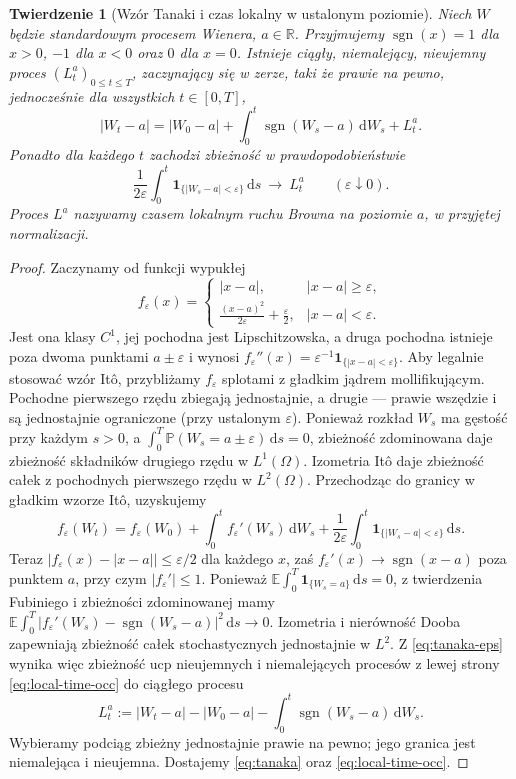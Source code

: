 \documentclass[11pt,a4paper,oneside]{report}
\numberwithin{equation}{chapter}
\theoremstyle{plain}
\newtheorem{twierdzenie}{Twierdzenie}[chapter]
\theoremstyle{definition}
\theoremstyle{remark}
\newcommand{\R}{\mathbb{R}}
\newcommand{\Prob}{\mathbb{P}}
\newcommand{\E}{\mathbb{E}}
\newcommand{\ind}[1]{\mathbf{1}_{#1}}
\newcommand{\dd}{\mathrm{d}}
\begin{document}
\begin{twierdzenie}[Wzór Tanaki i czas lokalny w ustalonym poziomie]
\label{th:tanaka}
Niech $W$ będzie standardowym procesem Wienera, $a\in\R$.
Przyjmujemy $\operatorname{sgn}(x)=1$ dla $x>0$,
$-1$ dla $x<0$ oraz $0$ dla $x=0$. Istnieje ciągły,
niemalejący, nieujemny proces $(L_t^a)_{0\le t\le T}$,
zaczynający się w zerze, taki że prawie na pewno,
jednocześnie dla wszystkich $t\in[0,T]$,
\[
|W_t-a|=|W_0-a|+\int_0^t\operatorname{sgn}(W_s-a)
\,\dd W_s+L_t^a.
\tag{3.7}\label{eq:tanaka}
\]
Ponadto dla każdego $t$ zachodzi zbieżność w
prawdopodobieństwie
\[
\frac1{2\varepsilon}\int_0^t
\ind{\{|W_s-a|<\varepsilon\}}\,\dd s
\ \longrightarrow\ L_t^a
\qquad(\varepsilon\downarrow0).
\tag{3.8}\label{eq:local-time-occ}
\]
Proces $L^a$ nazywamy \emph{czasem lokalnym} ruchu Browna
na poziomie $a$, w przyjętej normalizacji.
\end{twierdzenie}
\begin{proof}
Zaczynamy od funkcji wypukłej
\[
f_\varepsilon(x)=
\begin{cases}
|x-a|,&|x-a|\ge\varepsilon,\\
\displaystyle\frac{(x-a)^2}{2\varepsilon}+
\frac\varepsilon2,&|x-a|<\varepsilon.
\end{cases}
\]
Jest ona klasy $C^1$, jej pochodna jest Lipschitzowska,
a druga pochodna istnieje poza dwoma punktami
$a\pm\varepsilon$ i wynosi
$f_\varepsilon''(x)=\varepsilon^{-1}
\ind{\{|x-a|<\varepsilon\}}$.
Aby legalnie stosować wzór Itô, przybliżamy
$f_\varepsilon$ splotami z gładkim jądrem
mollifikującym. Pochodne pierwszego rzędu zbiegają
jednostajnie, a drugie — prawie wszędzie i są
jednostajnie ograniczone (przy ustalonym
$\varepsilon$). Ponieważ rozkład $W_s$ ma gęstość
przy każdym $s>0$, a $\int_0^T\Prob(W_s=a\pm\varepsilon)
\,\dd s=0$, zbieżność zdominowana daje
zbieżność składników drugiego rzędu w $L^1(\Omega)$.
Izometria Itô daje zbieżność całek z pochodnych
pierwszego rzędu w $L^2(\Omega)$.
Przechodząc do granicy w gładkim wzorze Itô, uzyskujemy
\[
f_\varepsilon(W_t)=f_\varepsilon(W_0)
+\int_0^t f_\varepsilon'(W_s)\,\dd W_s
+\frac1{2\varepsilon}\int_0^t
\ind{\{|W_s-a|<\varepsilon\}}\,\dd s.
\tag{3.9}\label{eq:tanaka-eps}
\]
Teraz $|f_\varepsilon(x)-|x-a||\le\varepsilon/2$ dla
każdego $x$, zaś $f_\varepsilon'(x)\to
\operatorname{sgn}(x-a)$ poza punktem $a$, przy czym
$|f_\varepsilon'|\le1$. Ponieważ
$\E\int_0^T\ind{\{W_s=a\}}\,\dd s=0$,
z twierdzenia Fubiniego i zbieżności zdominowanej
mamy
$\E\int_0^T|f_\varepsilon'(W_s)-
\operatorname{sgn}(W_s-a)|^2\,\dd s\to0$.
Izometria i nierówność Dooba zapewniają zbieżność
całek stochastycznych jednostajnie w $L^2$.
Z \eqref{eq:tanaka-eps} wynika więc zbieżność ucp
nieujemnych i niemalejących procesów z lewej strony
\eqref{eq:local-time-occ} do ciągłego procesu
\[
L_t^a:=|W_t-a|-|W_0-a|
-\int_0^t\operatorname{sgn}(W_s-a)\,\dd W_s.
\]
Wybieramy podciąg zbieżny jednostajnie prawie na pewno;
jego granica jest niemalejąca i nieujemna. Dostajemy
\eqref{eq:tanaka} oraz \eqref{eq:local-time-occ}.
\end{proof}
\end{document}
